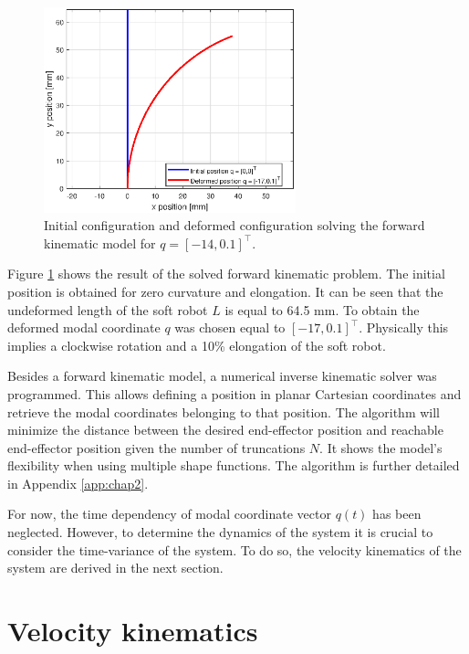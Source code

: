 \begin{figure}[H]
    \centering
    \includegraphics[width = 0.65\textwidth]{Figures/Chapter2/fkin1701.eps}
    \caption{Initial configuration and deformed configuration solving the forward kinematic model for $q = [-14,0.1]^\top$.}
    \label{fig1:forward_kinematic}
\end{figure}

Figure \ref{fig1:forward_kinematic} shows the result of the solved forward kinematic problem. The initial position is obtained for zero curvature and elongation. It can be seen that the undeformed length of the soft robot $L$ is equal to 64.5 mm. To obtain the deformed modal coordinate $q$ was chosen equal to $[-17,0.1]^\top$. Physically this implies a clockwise rotation and a 10\% elongation of the soft robot.


Besides a forward kinematic model, a numerical inverse kinematic solver was programmed. This allows defining a position in planar Cartesian coordinates and retrieve the modal coordinates belonging to that position. The algorithm will minimize the distance between the desired end-effector position and reachable end-effector position given the number of truncations $N$. It shows the model's flexibility when using multiple shape functions. The algorithm is further detailed in Appendix \ref{app:chap2}. 

For now, the time dependency of modal coordinate vector $q(t)$ has been neglected. However, to determine the dynamics of the system it is crucial to consider the time-variance of the system. To do so, the velocity kinematics of the system are derived in the next section.


\section{Velocity kinematics}

